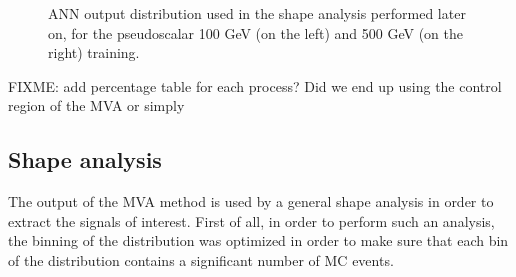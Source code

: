 \documentclass[a4paper, 10pt, openright]{report}
\begin{document}
\begin{figure}[htbp]
\caption{\ac{ANN} output distribution used in the shape analysis performed later on, for the pseudoscalar 100 GeV (on the left) and 500 GeV (on the right) training.}
\label{fig:ANNShapesPseudo}
\end{figure}

\color{red}FIXME: add percentage table for each process? Did we end up using the control region of the MVA or simply  \color{black}


\subsection{Shape analysis} \label{sec:Shape}

The output of the \ac{MVA} method is used by a general shape analysis in order to extract the signals of interest. First of all, in order to perform such an analysis, the binning of the distribution was optimized in order to make sure that each bin of the distribution contains a significant number of \ac{MC} events.
\end{document}
